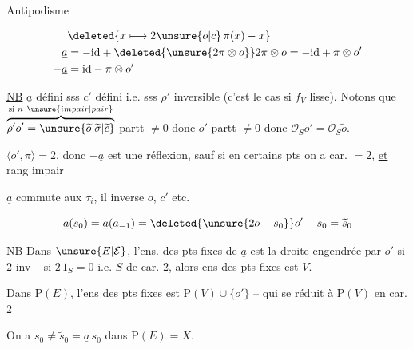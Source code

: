 Antipodisme

\[
\begin{aligned}
&\deleted{x\longmapsto 2\unsure{o|c}\,\pi(x)-x}\\
\underline a&=-\mathrm{id}+\deleted{\unsure{2\pi\otimes o}}2\pi\otimes o=-\mathrm{id}+\pi\otimes o'\\
-\underline a&=\mathrm{id}-\pi\otimes o'
\end{aligned}
\]


\uline{NB} $\underline a$ défini sss $c'$ défini i.e. sss $\rho'$ inversible (c'est le cas si $f_V$ lisse). Notons que $\overbrace{\rho' o'=\unsure{\widetilde{o}|\widetilde{\sigma}|\widetilde{c}}}^{\text{si }n\ \unsure{impair|pair}}$ partt $\ne0$ donc $o'$ partt $\ne0$ donc $\mathcal O_S o'=\mathcal O_S\widetilde{o}$.


$\langle o',\pi\rangle=2$, donc $-\underline a$ est une réflexion, sauf si en certains pts on a car. $=2$, \uline{et}   rang impair

$\underline a$ commute aux $\tau_i$, il inverse $o$, $c'$ etc.

\[
\underline a(s_0)=\underline a(a_{-1})=\deleted{\unsure{2o-s_0}}o'-s_0=\widetilde{s}_0
\]

\uline{NB} Dans $\unsure{E|\mathcal E}$, l'ens. des pts fixes de $\underline a$ est  la droite engendrée par $o'$ si $2$ inv -- si $2\,1_S=0$ i.e. $S$ de car. 2, alors  ens des pts fixes est $V$.

Dans $\mathrm P(E)$, l'ens des pts fixes est $\mathrm P(V)\cup\{o'\}$ -- qui se réduit à $\mathrm P(V)$ en car. 2

On a $s_0\ne\widetilde{s}_0=\underline a\,s_0$ dans $\mathrm P(E)=X$.

